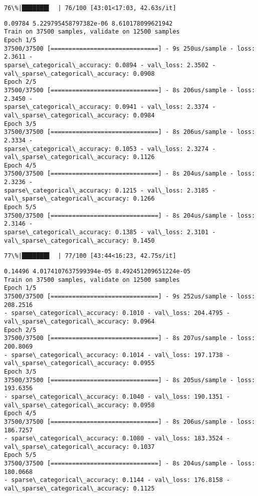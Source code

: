 \documentclass[11pt]{article}
\begin{document}
    \begin{Verbatim}[commandchars=\\\{\}]
 76\%|███████▌  | 76/100 [43:01<17:03, 42.63s/it]
    \end{Verbatim}

    \begin{Verbatim}[commandchars=\\\{\}]
0.09784 5.229795458797382e-06 8.610178099621942
Train on 37500 samples, validate on 12500 samples
Epoch 1/5
37500/37500 [==============================] - 9s 250us/sample - loss: 2.3611 -
sparse\_categorical\_accuracy: 0.0894 - val\_loss: 2.3502 -
val\_sparse\_categorical\_accuracy: 0.0908
Epoch 2/5
37500/37500 [==============================] - 8s 206us/sample - loss: 2.3450 -
sparse\_categorical\_accuracy: 0.0941 - val\_loss: 2.3374 -
val\_sparse\_categorical\_accuracy: 0.0984
Epoch 3/5
37500/37500 [==============================] - 8s 206us/sample - loss: 2.3334 -
sparse\_categorical\_accuracy: 0.1053 - val\_loss: 2.3274 -
val\_sparse\_categorical\_accuracy: 0.1126
Epoch 4/5
37500/37500 [==============================] - 8s 204us/sample - loss: 2.3236 -
sparse\_categorical\_accuracy: 0.1215 - val\_loss: 2.3185 -
val\_sparse\_categorical\_accuracy: 0.1266
Epoch 5/5
37500/37500 [==============================] - 8s 204us/sample - loss: 2.3146 -
sparse\_categorical\_accuracy: 0.1385 - val\_loss: 2.3101 -
val\_sparse\_categorical\_accuracy: 0.1450
    \end{Verbatim}

    \begin{Verbatim}[commandchars=\\\{\}]
 77\%|███████▋  | 77/100 [43:44<16:23, 42.75s/it]
    \end{Verbatim}

    \begin{Verbatim}[commandchars=\\\{\}]
0.14496 4.0174107637599394e-05 8.492451209651224e-05
Train on 37500 samples, validate on 12500 samples
Epoch 1/5
37500/37500 [==============================] - 9s 252us/sample - loss: 208.2516
- sparse\_categorical\_accuracy: 0.1010 - val\_loss: 204.4795 -
val\_sparse\_categorical\_accuracy: 0.0964
Epoch 2/5
37500/37500 [==============================] - 8s 207us/sample - loss: 200.8069
- sparse\_categorical\_accuracy: 0.1014 - val\_loss: 197.1738 -
val\_sparse\_categorical\_accuracy: 0.0955
Epoch 3/5
37500/37500 [==============================] - 8s 205us/sample - loss: 193.6356
- sparse\_categorical\_accuracy: 0.1040 - val\_loss: 190.1351 -
val\_sparse\_categorical\_accuracy: 0.0958
Epoch 4/5
37500/37500 [==============================] - 8s 206us/sample - loss: 186.7257
- sparse\_categorical\_accuracy: 0.1080 - val\_loss: 183.3524 -
val\_sparse\_categorical\_accuracy: 0.1037
Epoch 5/5
37500/37500 [==============================] - 8s 204us/sample - loss: 180.0668
- sparse\_categorical\_accuracy: 0.1144 - val\_loss: 176.8158 -
val\_sparse\_categorical\_accuracy: 0.1125
    \end{Verbatim}
\end{document}
